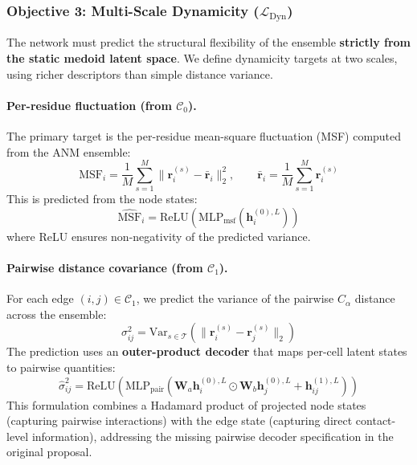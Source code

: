 \documentclass{article}
\begin{document}
\subsubsection{Objective 3: Multi-Scale Dynamicity ($\mathcal{L}_{\text{Dyn}}$)}

The network must predict the structural flexibility of the ensemble \textbf{strictly from the static medoid latent space}. We define dynamicity targets at two scales, using richer descriptors than simple distance variance.

\paragraph{Per-residue fluctuation (from $\mathcal{C}_0$).} The primary target is the per-residue mean-square fluctuation (MSF) computed from the ANM ensemble:
\begin{equation}
    \text{MSF}_i = \frac{1}{M} \sum_{s=1}^{M} \|\mathbf{r}_i^{(s)} - \bar{\mathbf{r}}_i\|_2^2, \qquad \bar{\mathbf{r}}_i = \frac{1}{M} \sum_{s=1}^{M} \mathbf{r}_i^{(s)}
\end{equation}
This is predicted from the node states:
\begin{equation}
    \widehat{\text{MSF}}_i = \text{ReLU}(\text{MLP}_{\text{msf}}(\mathbf{h}_i^{(0),L}))
\end{equation}
where ReLU ensures non-negativity of the predicted variance.

\paragraph{Pairwise distance covariance (from $\mathcal{C}_1$).} For each edge $(i,j) \in \mathcal{C}_1$, we predict the variance of the pairwise $C_\alpha$ distance across the ensemble:
\begin{equation}
    \sigma^2_{ij} = \text{Var}_{s \in \mathcal{T}}\left(\|\mathbf{r}_i^{(s)} - \mathbf{r}_j^{(s)}\|_2\right)
\end{equation}
The prediction uses an \textbf{outer-product decoder} that maps per-cell latent states to pairwise quantities:
\begin{equation}
    \hat{\sigma}^2_{ij} = \text{ReLU}\left(\text{MLP}_{\text{pair}}\left(\mathbf{W}_a \mathbf{h}_i^{(0),L} \odot \mathbf{W}_b \mathbf{h}_j^{(0),L} + \mathbf{h}_{ij}^{(1),L}\right)\right)
\end{equation}
This formulation combines a Hadamard product of projected node states (capturing pairwise interactions) with the edge state (capturing direct contact-level information), addressing the missing pairwise decoder specification in the original proposal.
\end{document}
